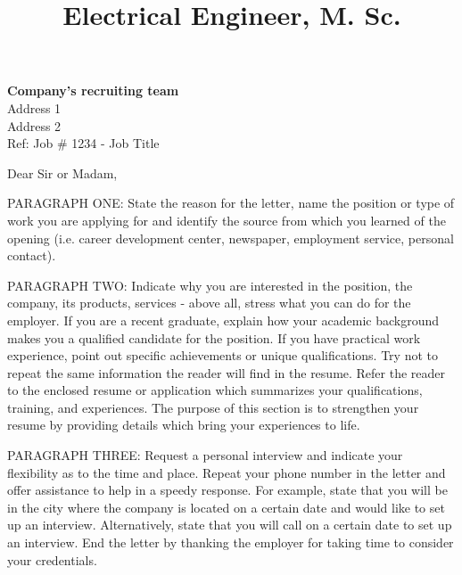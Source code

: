 \documentclass[stdletter,11pt,letterpaper,final]{moderncv}
\title{Electrical Engineer, M. Sc.}
\begin{document}
\maketitle 

\textbf{Company's recruiting team}\\
Address 1\\
Address 2\\
Ref: Job \# 1234 - Job Title\\
\newline

Dear Sir or Madam,
\newline


\par PARAGRAPH ONE: State the reason for the letter, name the position or type of work you are applying for and identify the source from which you learned of the opening (i.e. career development center, newspaper, employment service, personal contact).
\newline

\par PARAGRAPH TWO: Indicate why you are interested in the position, the company, its products, services - above all, stress what you can do for the employer. If you are a recent graduate, explain how your academic background makes you a qualified candidate for the position. If you have practical work experience, point out specific achievements or unique qualifications. Try not to repeat the same information the reader will find in the resume. Refer the reader to the enclosed resume or application which summarizes your qualifications, training, and experiences. The purpose of this section is to strengthen your resume by providing details which bring your experiences to life.
\newline
 
\par PARAGRAPH THREE: Request a personal interview and indicate your flexibility as to the time and place. Repeat your phone number in the letter and offer assistance to help in a speedy response. For example, state that you will be in the city where the company is located on a certain date and would like to set up an interview. Alternatively, state that you will call on a certain date to set up an interview. End the letter by thanking the employer for taking time to consider your credentials.
\newline
\end{document}
